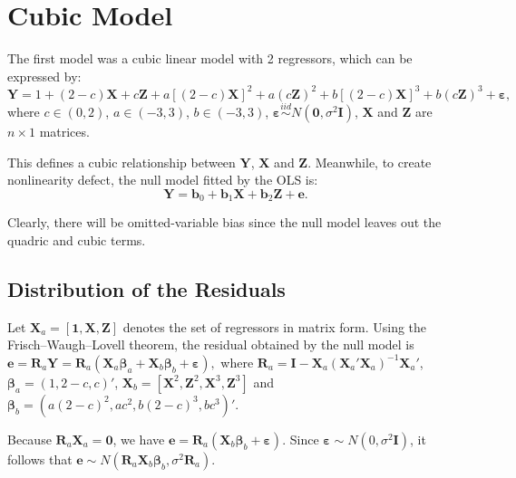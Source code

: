 \documentclass{monashthesis}
\begin{document}
\hypertarget{cubic-model}{%
\section{Cubic Model}\label{cubic-model}}

The first model was a cubic linear model with 2 regressors, which can be expressed by: \[\boldsymbol{Y}= 1 + (2-c)\boldsymbol{X} + c\boldsymbol{Z} + a[(2-c)\boldsymbol{X}]^2+a(c\boldsymbol{Z})^2+b[(2-c)\boldsymbol{X}]^3+b(c\boldsymbol{Z})^3+\boldsymbol{\varepsilon},\] where \(c \in (0,2)\), \(a \in (-3,3)\), \(b \in (-3,3)\), \(\boldsymbol{\varepsilon}\overset{iid}{\sim} N(\boldsymbol{0},\sigma^2\boldsymbol{I})\), \(\boldsymbol{X}\) and \(\boldsymbol{Z}\) are \(n\times1\) matrices.

This defines a cubic relationship between \(\boldsymbol{Y}\), \(\boldsymbol{X}\) and \(\boldsymbol{Z}\). Meanwhile, to create nonlinearity defect, the null model fitted by the OLS is: \[\boldsymbol{Y}=\boldsymbol{b}_0+\boldsymbol{b}_1\boldsymbol{X}+\boldsymbol{b}_2\boldsymbol{Z}+\boldsymbol{e}.\]

Clearly, there will be omitted-variable bias since the null model leaves out the quadric and cubic terms.

\hypertarget{distribution-of-the-residuals}{%
\subsection{Distribution of the Residuals}\label{distribution-of-the-residuals}}

Let \(\boldsymbol{X}_a=[\boldsymbol{1},\boldsymbol{X},\boldsymbol{Z}]\) denotes the set of regressors in matrix form. Using the Frisch--Waugh--Lovell theorem, the residual obtained by the null model is \(\boldsymbol{e}=\boldsymbol{R}_a\boldsymbol{Y}=\boldsymbol{R}_a(\boldsymbol{X}_a\boldsymbol{\beta}_a+\boldsymbol{X}_b\boldsymbol{\beta}_b+\boldsymbol{\varepsilon}),\) where \(\boldsymbol{R}_a=\boldsymbol{I}-\boldsymbol{X}_a(\boldsymbol{X}_a'\boldsymbol{X}_a)^{-1}\boldsymbol{X}_a'\), \(\boldsymbol{\beta}_a=(1,2-c,c)'\), \(\boldsymbol{X}_b=[\boldsymbol{X}^2,\boldsymbol{Z}^2,\boldsymbol{X}^3,\boldsymbol{Z}^3]\) and \(\boldsymbol{\beta}_b=(a(2-c)^2,ac^2,b(2-c)^3,bc^3)'\).

Because \(\boldsymbol{R}_a\boldsymbol{X}_a=\boldsymbol{0}\), we have \(\boldsymbol{e}=\boldsymbol{R}_a(\boldsymbol{X}_b\boldsymbol{\beta}_b+\boldsymbol{\varepsilon}).\) Since \(\boldsymbol{\varepsilon} \sim N(0,\sigma^2\boldsymbol{I})\), it follows that \(\boldsymbol{e} \sim N(\boldsymbol{R}_a\boldsymbol{X}_b\boldsymbol{\beta}_b, \sigma^2\boldsymbol{R}_a)\).
\end{document}
